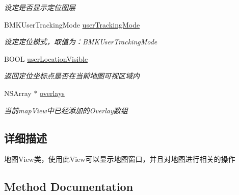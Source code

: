 \begin{DoxyCompactItemize}
\begin{DoxyCompactList}\small\item\em 设定是否显示定位图层 \end{DoxyCompactList}\item 
\hypertarget{interface_b_m_k_map_view_aac0adfff30441312452cef6844ef818b}{}B\+M\+K\+User\+Tracking\+Mode \hyperlink{interface_b_m_k_map_view_aac0adfff30441312452cef6844ef818b}{user\+Tracking\+Mode}\label{interface_b_m_k_map_view_aac0adfff30441312452cef6844ef818b}

\begin{DoxyCompactList}\small\item\em 设定定位模式，取值为：\+B\+M\+K\+User\+Tracking\+Mode \end{DoxyCompactList}\item 
\hypertarget{interface_b_m_k_map_view_ada9feb9e53eb9611b57a596c572bb280}{}B\+O\+O\+L \hyperlink{interface_b_m_k_map_view_ada9feb9e53eb9611b57a596c572bb280}{user\+Location\+Visible}\label{interface_b_m_k_map_view_ada9feb9e53eb9611b57a596c572bb280}

\begin{DoxyCompactList}\small\item\em 返回定位坐标点是否在当前地图可视区域内 \end{DoxyCompactList}\item 
\hypertarget{interface_b_m_k_map_view_a6c673c46ad9f146f80e48d82ebcf934b}{}N\+S\+Array $\ast$ \hyperlink{interface_b_m_k_map_view_a6c673c46ad9f146f80e48d82ebcf934b}{overlays}\label{interface_b_m_k_map_view_a6c673c46ad9f146f80e48d82ebcf934b}

\begin{DoxyCompactList}\small\item\em 当前map\+View中已经添加的\+Overlay数组 \end{DoxyCompactList}\end{DoxyCompactItemize}


\subsection{详细描述}
地图\+View类，使用此\+View可以显示地图窗口，并且对地图进行相关的操作 

\subsection{Method Documentation}
\hypertarget{interface_b_m_k_map_view_a2af9ed45c3a7fd530dd414dc573327b3}{}
